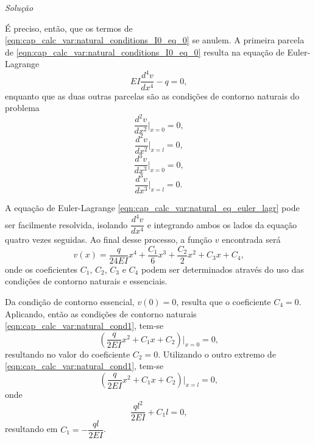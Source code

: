 \documentclass[
	12pt,				%
	openright,			%
    twoside,			%
	a4paper,			%
	chapter=TITLE,		%
	english,			%
	french,				%
	spanish,			%
	brazil				%
	]{abntex2}
\makeatletter
\renewenvironment{proof}[1][\proofname]{
	\par\pushQED{\qed}%
	\normalfont \topsep6\p@\@plus6\p@\relax
	\trivlist
	\item\relax
		{\itshape
			#1\@addpunct{.}}\hspace\labelsep\ignorespaces
}{%
	\popQED\endtrivlist\@endpefalse
}
\newenvironment{solution}{
	\begin{proof}[Solução]
}{%
	\end{proof}
}
\numberwithin{lema}{chapter}
\numberwithin{teorema}{chapter}
\numberwithin{definicao}{chapter}
\numberwithin{exemplo}{chapter}
\numberwithin{figure}{chapter}
\makeatother
\begin{document}
\begin{solution}
	É preciso, então, que os termos de \eqref{eqn:cap_calc_var:natural_conditions_I0_eq_0} se anulem. A primeira parcela de \eqref{eqn:cap_calc_var:natural_conditions_I0_eq_0} resulta na equação de Euler-Lagrange
	\begin{equation}
		\label{eqn:cap_calc_var:natural_eq_euler_lagr}
		EI\frac{d^4v}{dx^4} - q = 0
		\text{,}
	\end{equation}
	enquanto que as duas outras parcelas são as condições de contorno naturais do problema
	\begin{equation}
		\label{eqn:cap_calc_var:natural_cond1}
		\frac{d^2 v}{dx^2}\Big |_{x=0} = 0
		\text{,}
	\end{equation}
	\begin{equation}
		\label{eqn:cap_calc_var:natural_cond1_l}
		\frac{d^2 v}{dx^2}\Big |_{x=l} = 0
		\text{,}
	\end{equation}
	\begin{equation}
		\label{eqn:cap_calc_var:natural_cond2}
		\frac{d^3 v}{dx^3}\Big |_{x=0} = 0
		\text{,}
	\end{equation}
	\begin{equation}
		\label{eqn:cap_calc_var:natural_cond2_l}
		\frac{d^3 v}{dx^3}\Big |_{x=l} = 0
		\text{.}
	\end{equation}

	A equação de Euler-Lagrange \eqref{eqn:cap_calc_var:natural_eq_euler_lagr} pode ser facilmente resolvida, isolando $\dfrac{d^4 v}{dx^4}$ e integrando ambos os lados da equação quatro vezes seguidas. Ao final desse processo, a função $v$ encontrada será
	\begin{equation}
		\label{eqn:cap_calc_var:natural_funcao_v}
		v(x)=\frac{q}{24EI}x^4 + \frac{C_1}{6}x^3 + \frac{C_2}{2}x^2 + C_3x + C_4
		\text{,}
	\end{equation}
	onde os coeficientes $C_1$, $C_2$, $C_3$ e $C_4$ podem ser determinados através do uso das condições de contorno naturais e essenciais.

	Da condição de contorno essencial, $v(0)=0$, resulta que o coeficiente $C_4=0$. Aplicando, então as condições de contorno naturais \eqref{eqn:cap_calc_var:natural_cond1}, tem-se
	$$
		\left (
			\frac{q}{2EI}x^2 + C_1x + C_2
		\right ) \Big |_{x=0}
		= 0
		\text{,}
	$$
	resultando no valor do coeficiente $C_2=0$. Utilizando o outro extremo de \eqref{eqn:cap_calc_var:natural_cond1}, tem-se
	$$
		\left (
			\frac{q}{2EI}x^2 + C_1x + C_2
		\right ) \Big |_{x=l}
		=0
		\text{,}
	$$
	onde
	$$
		\frac{ql^2}{2EI}+C_1l=0
		\text{,}
	$$
	resultando em $C_1=-\dfrac{ql}{2EI}$.


\end{solution}
\end{document}

